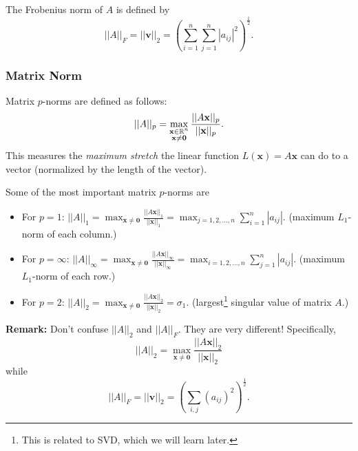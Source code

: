 \documentclass[letterpaper]{article}
\newcommand{\0}{\mathbf{0}}
\newcommand{\x}{\mathbf{x}}
\newcommand{\vv}{\mathbf{v}}
\begin{document}
The Frobenius norm of $A$ is defined by 
\[||A||_F = ||\vv||_2 = \left(\sum_{i = 1}^{n} \sum_{j = 1}^{n} |a_{ij}|^2\right)^{\frac{1}{2}}.\]

\subsubsection{Matrix Norm}
Matrix $p$-norms are defined as follows: 
\[||A||_p = \max_{\substack{\x \in \R^n \\ \x \neq \0}} \frac{||A\x||_p}{||\x||_p}.\]
This measures the \emph{maximum stretch} the linear function $L(\x) = A\x$ can do to a vector (normalized by the length of the vector).

\bigskip 

Some of the most important matrix $p$-norms are 
\begin{itemize}
    \item For $p = 1$: $||A||_1 = \max_{\x \neq \0} \frac{||A\x||_1}{||\x||_1} = \max_{j = 1, 2, \hdots, n} \sum_{i = 1}^{n} |a_{ij}|.$ (maximum $L_1$-norm of each column.) 
    \item For $p = \infty$: $||A||_\infty = \max_{\x \neq \0} \frac{||A\x||_\infty}{||\x||_\infty} = \max_{i = 1, 2, \hdots, n} \sum_{j = 1}^{n} |a_{ij}|.$ (maximum $L_1$-norm of each row.)
    \item For $p = 2$: $||A||_2 = \max_{\x \neq \0} \frac{||A\x||_2}{||\x||_2} = \sigma_1.$ (largest\footnote{This is related to SVD, which we will learn later.} singular value of matrix $A$.)
\end{itemize}
\textbf{Remark:} Don't confuse $||A||_2$ and $||A||_F$. They are very different! Specifically, 
\[||A||_2 = \max_{\x \neq \0} \frac{||A\x||_2}{||\x||_2}\]
while 
\[||A||_F = ||\vv||_2 = \left(\sum_{i, j} (a_{ij})^2\right)^{\frac{1}{2}}.\]
\end{document}
